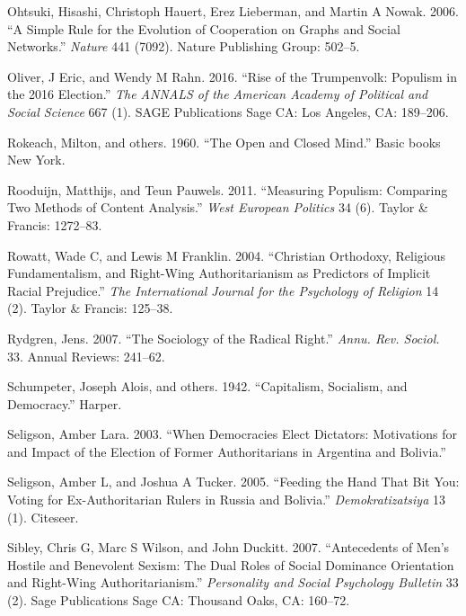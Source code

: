 \documentclass[12 pt,]{article}
\begin{document}
\leavevmode\hypertarget{ref-ohtsuki2006cooperation}{}%
Ohtsuki, Hisashi, Christoph Hauert, Erez Lieberman, and Martin A Nowak.
2006. ``A Simple Rule for the Evolution of Cooperation on Graphs and
Social Networks.'' \emph{Nature} 441 (7092). Nature Publishing Group:
502--5.

\leavevmode\hypertarget{ref-oliver2016rise}{}%
Oliver, J Eric, and Wendy M Rahn. 2016. ``Rise of the Trumpenvolk:
Populism in the 2016 Election.'' \emph{The ANNALS of the American
Academy of Political and Social Science} 667 (1). SAGE Publications Sage
CA: Los Angeles, CA: 189--206.

\leavevmode\hypertarget{ref-rokeach1960open}{}%
Rokeach, Milton, and others. 1960. ``The Open and Closed Mind.'' Basic
books New York.

\leavevmode\hypertarget{ref-rooduijn2011measuring}{}%
Rooduijn, Matthijs, and Teun Pauwels. 2011. ``Measuring Populism:
Comparing Two Methods of Content Analysis.'' \emph{West European
Politics} 34 (6). Taylor \& Francis: 1272--83.

\leavevmode\hypertarget{ref-rowatt2004christian}{}%
Rowatt, Wade C, and Lewis M Franklin. 2004. ``Christian Orthodoxy,
Religious Fundamentalism, and Right-Wing Authoritarianism as Predictors
of Implicit Racial Prejudice.'' \emph{The International Journal for the
Psychology of Religion} 14 (2). Taylor \& Francis: 125--38.

\leavevmode\hypertarget{ref-rydgren2007sociology}{}%
Rydgren, Jens. 2007. ``The Sociology of the Radical Right.'' \emph{Annu.
Rev. Sociol.} 33. Annual Reviews: 241--62.

\leavevmode\hypertarget{ref-schumpeter1942capitalism}{}%
Schumpeter, Joseph Alois, and others. 1942. ``Capitalism, Socialism, and
Democracy.'' Harper.

\leavevmode\hypertarget{ref-seligson2003democracies}{}%
Seligson, Amber Lara. 2003. ``When Democracies Elect Dictators:
Motivations for and Impact of the Election of Former Authoritarians in
Argentina and Bolivia.''

\leavevmode\hypertarget{ref-seligson2005feeding}{}%
Seligson, Amber L, and Joshua A Tucker. 2005. ``Feeding the Hand That
Bit You: Voting for Ex-Authoritarian Rulers in Russia and Bolivia.''
\emph{Demokratizatsiya} 13 (1). Citeseer.

\leavevmode\hypertarget{ref-sibley2007antecedents}{}%
Sibley, Chris G, Marc S Wilson, and John Duckitt. 2007. ``Antecedents of
Men's Hostile and Benevolent Sexism: The Dual Roles of Social Dominance
Orientation and Right-Wing Authoritarianism.'' \emph{Personality and
Social Psychology Bulletin} 33 (2). Sage Publications Sage CA: Thousand
Oaks, CA: 160--72.
\end{document}
